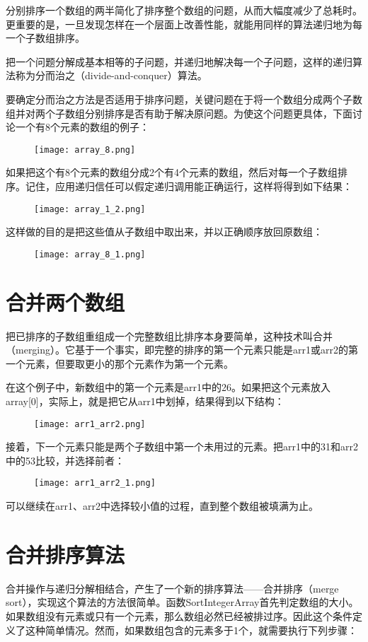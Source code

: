 分别排序一个数组的两半简化了排序整个数组的问题，从而大幅度减少了总耗时。更重要的是，一旦发现怎样在一个层面上改善性能，就能用同样的算法递归地为每一个子数组排序。

把一个问题分解成基本相等的子问题，并递归地解决每一个子问题，这样的递归算法称为分而治之（divide-and-conquer）算法。

要确定分而治之方法是否适用于排序问题，关键问题在于将一个数组分成两个子数组并对两个子数组分别排序是否有助于解决原问题。为使这个问题更具体，下面讨论一个有8个元素的数组的例子：
\begin{figure}[!h]
\texttt{[image: array\_8.png]}
\end{figure}

如果把这个有8个元素的数组分成2个有4个元素的数组，然后对每一个子数组排序。记住，应用递归信任可以假定递归调用能正确运行，这样将得到如下结果：
\begin{figure}[!h]
\texttt{[image: array\_1\_2.png]}
\end{figure}
这样做的目的是把这些值从子数组中取出来，并以正确顺序放回原数组：
\begin{figure}[!h]
\texttt{[image: array\_8\_1.png]}
\end{figure}

\section{合并两个数组}

把已排序的子数组重组成一个完整数组比排序本身要简单，这种技术叫合并（merging）。它基于一个事实，即完整的排序的第一个元素只能是arr1或arr2的第一个元素，但要取更小的那个元素作为第一个元素。

在这个例子中，新数组中的第一个元素是arr1中的26。如果把这个元素放入array[0]，实际上，就是把它从arr1中划掉，结果得到以下结构：
\begin{figure}[!h]
\texttt{[image: arr1\_arr2.png]}
\end{figure}
接着，下一个元素只能是两个子数组中第一个未用过的元素。把arr1中的31和arr2中的53比较，并选择前者：
\begin{figure}[!h]
\texttt{[image: arr1\_arr2\_1.png]}
\end{figure}
可以继续在arr1、arr2中选择较小值的过程，直到整个数组被填满为止。

\section{合并排序算法}

合并操作与递归分解相结合，产生了一个新的排序算法——合并排序（merge sort），实现这个算法的方法很简单。函数SortIntegerArray首先判定数组的大小。如果数组没有元素或只有一个元素，那么数组必然已经被排过序。因此这个条件定义了这种简单情况。然而，如果数组包含的元素多于1个，就需要执行下列步骤：

